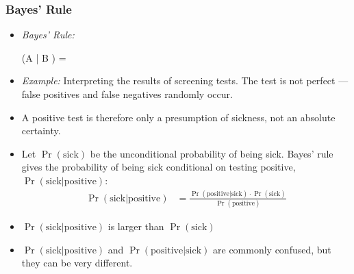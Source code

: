 

\begin{frame}
\frametitle{Bayes' Rule}
\begin{itemize}
\item \emph{Bayes' Rule:}
\begin{emphalign*}
\Pr(A | B ) = 
\end{emphalign*}
\item \emph{Example:} Interpreting the results of screening tests. The test is not perfect --- false positives and false negatives randomly occur. 
\item A positive test is therefore only a presumption of sickness, not an absolute certainty.
\item Let $\Pr(\text{sick})$ be the unconditional probability of being sick. Bayes' rule gives the probability of being sick conditional on testing positive, $\Pr(\text{sick}|\text{positive})$:
\begin{align*}
\Pr(\text{sick}|\text{positive}) 
  & = \frac{\Pr(\text{positive}|\text{sick}) \cdot \Pr(\text{sick})} {\Pr(\text{positive})}
\end{align*}
\item $\Pr(\text{sick}|\text{positive})$ is larger than $\Pr(\text{sick})$
\item $\Pr(\text{sick}|\text{positive})$ and $\Pr(\text{positive}|\text{sick})$ are commonly confused, but they can be very different. 
\end{itemize}
\end{frame}

